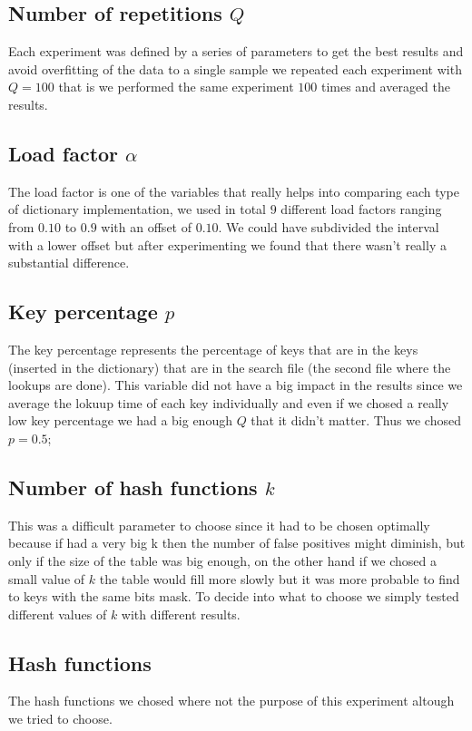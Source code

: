 \documentclass{article}
\begin{document}
    \subsection*{Number of repetitions $Q$}
    		   Each experiment was defined by a series of parameters to get the best results and avoid overfitting of the data to a single sample we 
    		   repeated each experiment with $Q=100$ that is we performed the same experiment $100$ times and averaged the results. 
   
   \subsection*{Load factor $\alpha$}
   		   The load factor is one of the variables that really helps into comparing each type of dictionary implementation, we used in total 
   		   $9$ different load factors ranging from $0.10$ to $0.9$ with an offset of $0.10$. We could have subdivided the interval with a lower 
   		   offset but after experimenting we found that there wasn't really a substantial difference. 
   		   
   \subsection*{Key percentage $p$}
   		  The key percentage represents the percentage of keys that are in the keys (inserted in the dictionary) that are in the search file (the second file where the lookups are done). 
   		  This variable did not have a big impact in the results since we average the lokuup time of each key individually and even if we chosed a really low key percentage we had a big enough 
   		  $Q$ that it didn't matter. Thus we chosed $p=0.5$;
   		  
    \subsection*{Number of hash functions $k$}
    		 This was a difficult parameter to choose since it had to be chosen optimally because if had a very big k then the number of false positives might diminish, but only if the size of the table
    		 was big enough, on the other hand if we chosed a small value of $k$ the table would fill more slowly but it was more probable to find to keys with the same bits mask. To decide into what to choose 
    		 we simply tested different values of $k$ with different results. 
    		 
    \subsection*{Hash functions}
    		The hash functions we chosed where not the purpose of this experiment altough we tried to choose. 
    		
\end{document}
